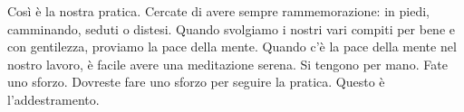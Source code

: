 Così è la nostra pratica. Cercate di avere sempre rammemorazione: in
piedi, camminando, seduti o distesi. Quando svolgiamo i nostri vari
compiti per bene e con gentilezza, proviamo la pace della mente. Quando
c'è la pace della mente nel nostro lavoro, è facile avere una
meditazione serena. Si tengono per mano. Fate uno sforzo. Dovreste fare
uno sforzo per seguire la pratica. Questo è l'addestramento.

